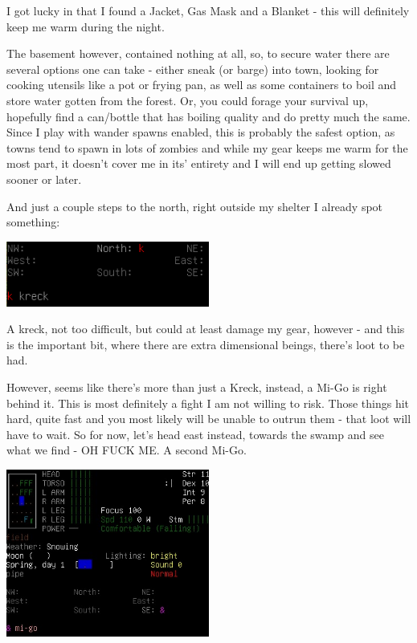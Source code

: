 \documentclass[11pt]{report}
\begin{document}
I got lucky in that I found a Jacket, Gas Mask and a Blanket - this will definitely keep me warm during the night.

The basement however, contained nothing at all, so, to secure water there are several options one can take - either sneak (or barge) into town, looking for cooking utensils like a pot or frying pan, as well as some containers to boil and store water gotten from the forest. Or, you could forage your survival up, hopefully find a can/bottle that has boiling quality and do pretty much the same. Since I play with wander spawns enabled, this is probably the safest option, as towns tend to spawn in lots of zombies and while my gear keeps me warm for the most part, it doesn't cover me in its' entirety and I will end up getting slowed sooner or later.

And just a couple steps to the north, right outside my shelter I already spot something:

\begin{center}
    \includegraphics[width=0.5\textwidth]{08}
\end{center}

A kreck, not too difficult, but could at least damage my gear, however - and this is the important bit, where there are extra dimensional beings, there's loot to be had.

However, seems like there's more than just a Kreck, instead, a Mi-Go is right behind it. This is most definitely a fight I am not willing to risk. Those things hit hard, quite fast and you most likely will be unable to outrun them - that loot will have to wait.
So for now, let's head east instead, towards the swamp and see what we find - OH FUCK ME. A second Mi-Go.

\begin{center}
    \includegraphics[width=0.5\textwidth]{09}
\end{center}
\end{document}
